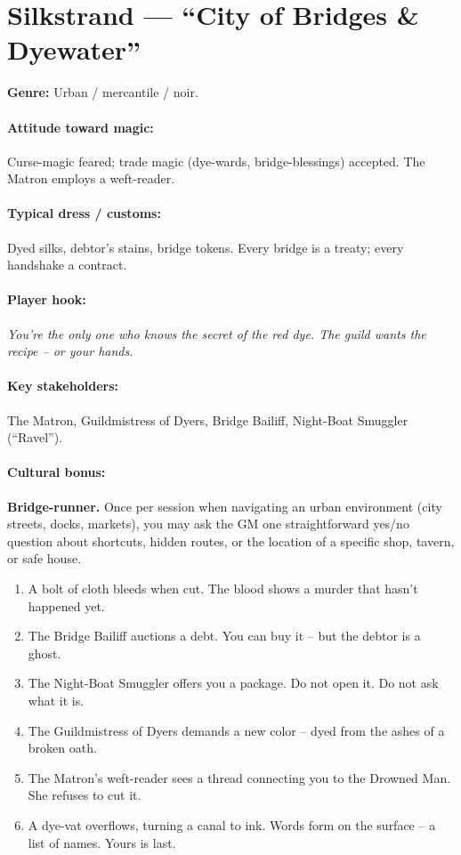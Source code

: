 \section{Silkstrand --- ``City of Bridges \& Dyewater''}
\textbf{Genre:} Urban / mercantile / noir.

\paragraph{Attitude toward magic:} Curse-magic feared; trade magic (dye-wards, bridge-blessings) accepted. The Matron employs a weft-reader.

\paragraph{Typical dress / customs:} Dyed silks, debtor's stains, bridge tokens. Every bridge is a treaty; every handshake a contract.

\paragraph{Player hook:} \emph{You're the only one who knows the secret of the red dye. The guild wants the recipe -- or your hands.}

\paragraph{Key stakeholders:} The Matron, Guildmistress of Dyers, Bridge Bailiff, Night-Boat Smuggler (``Ravel'').

\paragraph{Cultural bonus:} \textbf{Bridge-runner.} Once per session when navigating an urban environment (city streets, docks, markets), you may ask the GM one straightforward yes/no question about shortcuts, hidden routes, or the location of a specific shop, tavern, or safe house.

\begin{tcolorbox}[colback=gray!5!white, colframe=gray!70!black, title=Silkstrand Mini-Generator (d6),breakable]
\begin{enumerate}
\item A bolt of cloth bleeds when cut. The blood shows a murder that hasn't happened yet.
\item The Bridge Bailiff auctions a debt. You can buy it -- but the debtor is a ghost.
\item The Night-Boat Smuggler offers you a package. Do not open it. Do not ask what it is.
\item The Guildmistress of Dyers demands a new color -- dyed from the ashes of a broken oath.
\item The Matron's weft-reader sees a thread connecting you to the Drowned Man. She refuses to cut it.
\item A dye-vat overflows, turning a canal to ink. Words form on the surface -- a list of names. Yours is last.
\end{enumerate}
\end{tcolorbox}


